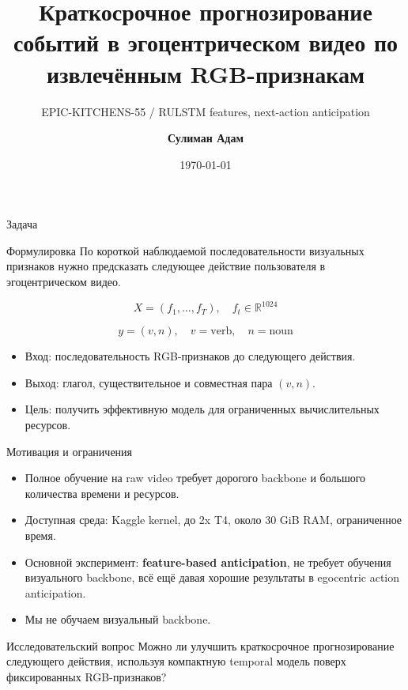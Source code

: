 \documentclass[aspectratio=169,10pt]{beamer}
\title[Прогнозирование действий по RGB-признакам]{Краткосрочное прогнозирование событий в эгоцентрическом видео по извлечённым RGB-признакам}
\subtitle{EPIC-KITCHENS-55 / RULSTM features, next-action anticipation}
\author{\textbf{Сулиман Адам}}
\date{\today}
\begin{document}
\begin{frame}
    \titlepage
\end{frame}

\begin{frame}{Задача}
    \begin{block}{Формулировка}
        По короткой наблюдаемой последовательности визуальных признаков нужно предсказать следующее действие пользователя в эгоцентрическом видео.
    \end{block}

    \[
        X = (f_1, \ldots, f_T), \quad f_t \in \mathbb{R}^{1024}
    \]

    \[
        y = (v, n), \quad v = \text{verb}, \quad n = \text{noun}
    \]

    \begin{itemize}
        \item Вход: последовательность RGB-признаков до следующего действия.
        \item Выход: глагол, существительное и совместная пара \((v,n)\).
        \item Цель: получить эффективную модель для ограниченных вычислительных ресурсов.
    \end{itemize}
\end{frame}

\begin{frame}{Мотивация и ограничения}
    \begin{itemize}
        \item Полное обучение на raw video требует дорогого backbone и большого количества времени и ресурсов.
        \item Доступная среда: Kaggle kernel, до 2x T4, около 30 GiB RAM, ограниченное время.
        \item Основной эксперимент: \textbf{feature-based anticipation}, не требует обучения визуального backbone, всё ещё давая хорошие результаты в egocentric action anticipation.
        \item Мы не обучаем визуальный backbone.
    \end{itemize}

    \vspace{0.4cm}
    \begin{block}{Исследовательский вопрос}
        Можно ли улучшить краткосрочное прогнозирование следующего действия, используя компактную temporal модель поверх фиксированных RGB-признаков?
    \end{block}
\end{frame}
\end{document}
